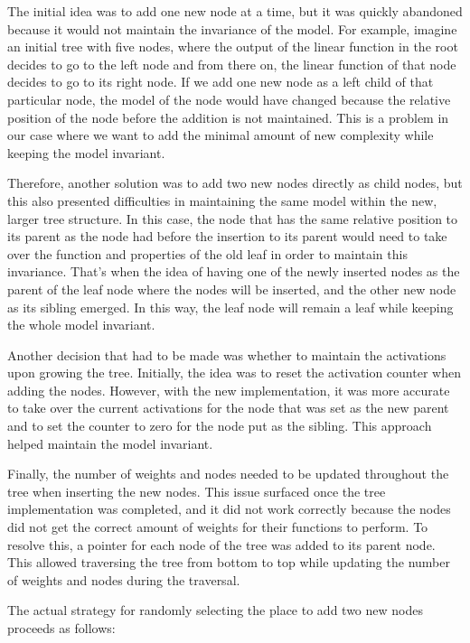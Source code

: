 The initial idea was to add one new node at a time, but it was quickly abandoned because it would not maintain the invariance of the model. For example, imagine an initial tree with five nodes, where the output of the linear function in the root decides to go to the left node and from there on, the linear function of that node decides to go to its right node. If we add one new node as a left child of that particular node, the model of the node would have changed because the relative position of the node before the addition is not maintained. This is a problem in our case where we want to add the minimal amount of new complexity while keeping the model invariant.

Therefore, another solution was to add two new nodes directly as child nodes, but this also presented difficulties in maintaining the same model within the new, larger tree structure. In this case, the node that has the same relative position to its parent as the node had before the insertion to its parent would need to take over the function and properties of the old leaf in order to maintain this invariance. That's when the idea of having one of the newly inserted nodes as the parent of the leaf node where the nodes will be inserted, and the other new node as its sibling emerged. In this way, the leaf node will remain a leaf while keeping the whole model invariant.

Another decision that had to be made was whether to maintain the activations upon growing the tree. Initially, the idea was to reset the activation counter when adding the nodes. However, with the new implementation, it was more accurate to take over the current activations for the node that was set as the new parent and to set the counter to zero for the node put as the sibling. This approach helped maintain the model invariant.

Finally, the number of weights and nodes needed to be updated throughout the tree when inserting the new nodes. This issue surfaced once the tree implementation was completed, and it did not work correctly because the nodes did not get the correct amount of weights for their functions to perform. To resolve this, a pointer for each node of the tree was added to its parent node. This allowed traversing the tree from bottom to top while updating the number of weights and nodes during the traversal.

The actual strategy for randomly selecting the place to add two new nodes proceeds as follows:

